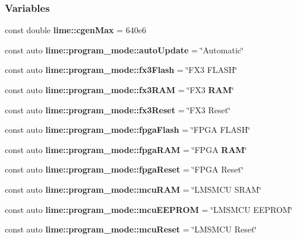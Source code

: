 \subsubsection*{Variables}
\begin{DoxyCompactItemize}
\item 
const double {\bf lime\+::cgen\+Max} = 640e6
\item 
const auto {\bf lime\+::program\+\_\+mode\+::auto\+Update} = \char`\"{}Automatic\char`\"{}
\item 
const auto {\bf lime\+::program\+\_\+mode\+::fx3\+Flash} = \char`\"{}F\+X3 F\+L\+A\+SH\char`\"{}
\item 
const auto {\bf lime\+::program\+\_\+mode\+::fx3\+R\+AM} = \char`\"{}F\+X3 {\bf R\+AM}\char`\"{}
\item 
const auto {\bf lime\+::program\+\_\+mode\+::fx3\+Reset} = \char`\"{}F\+X3 Reset\char`\"{}
\item 
const auto {\bf lime\+::program\+\_\+mode\+::fpga\+Flash} = \char`\"{}F\+P\+GA F\+L\+A\+SH\char`\"{}
\item 
const auto {\bf lime\+::program\+\_\+mode\+::fpga\+R\+AM} = \char`\"{}F\+P\+GA {\bf R\+AM}\char`\"{}
\item 
const auto {\bf lime\+::program\+\_\+mode\+::fpga\+Reset} = \char`\"{}F\+P\+GA Reset\char`\"{}
\item 
const auto {\bf lime\+::program\+\_\+mode\+::mcu\+R\+AM} = \char`\"{}L\+M\+S\+M\+CU S\+R\+AM\char`\"{}
\item 
const auto {\bf lime\+::program\+\_\+mode\+::mcu\+E\+E\+P\+R\+OM} = \char`\"{}L\+M\+S\+M\+CU E\+E\+P\+R\+OM\char`\"{}
\item 
const auto {\bf lime\+::program\+\_\+mode\+::mcu\+Reset} = \char`\"{}L\+M\+S\+M\+CU Reset\char`\"{}
\end{DoxyCompactItemize}
